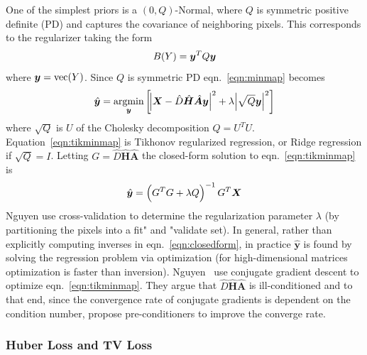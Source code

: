 One of the simplest priors is a \((0, Q)\)-Normal, where \(Q\) is symmetric positive definite (PD) and captures the covariance of neighboring pixels.
%
This corresponds to the regularizer taking the form
\begin{equation}
    B(Y) = \bm{y} ^T Q \bm{y}
\end{equation}
where \(\bm{y} = \text{vec}(Y)\).
%
Since \(Q\) is symmetric PD eqn.~\eqref{eqn:minmap} becomes
\begin{equation}
    \hat{\bm{y}} = \underset{\bm{y}}{\text{argmin}}\left[ \abs{ \bm{X} - \hat{D} \hat{\bm{H}} \hat{\bm{A}} \bm{y} }^2 +\lambda \abs{ \sqrt{Q}\bm{y} }^2 \right]
    \label{eqn:tikminmap}
\end{equation}
where \(\sqrt{Q}\) is \(U\) of the Cholesky decomposition \(Q = U^T U\).
%
Equation~\ref{eqn:tikminmap} is Tikhonov regularized regression, or Ridge regression if \(\sqrt{Q} = I\).
%
Letting \(G = \hat{D} \hat{\bm{H}} \hat{\bm{A}}\) the closed-form solution to eqn.~\eqref{eqn:tikminmap} is
\begin{equation}
    \hat{\bm{y}} = \left( G^T G + \lambda Q \right)^{-1} G^T\bm{X}
    \label{eqn:closedform}
\end{equation}
Nguyen \etal\cite{milanfar2001} use cross-validation to determine the regularization parameter \(\lambda\) (by partitioning the pixels into a fit" and "validate set).
%
In general, rather than explicitly computing inverses in eqn.~\eqref{eqn:closedform}, in practice \(\hat{\bm{y}}\) is found by solving the regression problem via optimization (for high-dimensional matrices optimization is faster than inversion).
%
Nguyen \etal~use conjugate gradient descent to optimize eqn.~\eqref{eqn:tikminmap}.
%
They argue that \(\hat{D} \hat{\bm{H}} \hat{\bm{A}}\) is ill-conditioned and to that end, since the convergence rate of conjugate gradients is dependent on the condition number\cite{vanderSluis1986}, propose pre-conditioners to improve the converge rate.

\subsubsection{Huber Loss and TV Loss}

